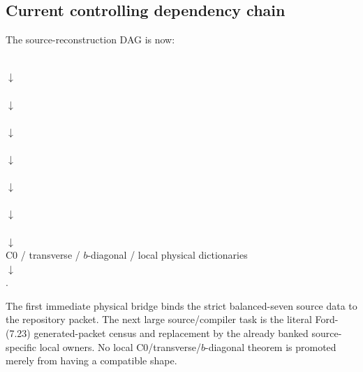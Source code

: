 \subsection{Current controlling dependency chain}
The source-reconstruction DAG is now:
\begin{center}
\small
{}\\
$\downarrow$\\
\\
$\downarrow$\\
\\
$\downarrow$\\
\\
$\downarrow$\\
\\
$\downarrow$\\
\\
$\downarrow$\\
\\
$\downarrow$\\
C0 / transverse / $b$-diagonal / local physical dictionaries\\
$\downarrow$\\
.
\end{center}
The first immediate physical bridge binds the strict balanced-seven source data to the
repository packet.  The next large source/compiler task is the literal Ford-(7.23)
generated-packet census and replacement by the already banked source-specific local owners.
No local C0/transverse/$b$-diagonal theorem is promoted merely from having a compatible
shape.

